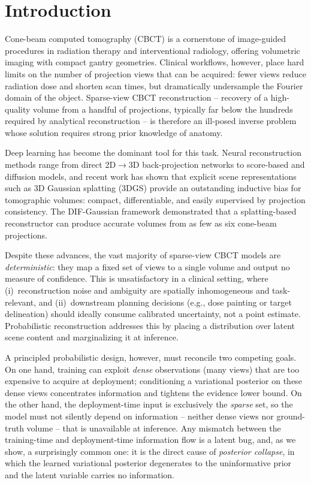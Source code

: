 
\section{Introduction}
\label{sec:intro}

Cone-beam computed tomography (CBCT) is a cornerstone of image-guided
procedures in radiation therapy and interventional radiology, offering
volumetric imaging with compact gantry geometries. Clinical workflows,
however, place hard limits on the number of projection views that can be
acquired: fewer views reduce radiation dose and shorten scan times, but
dramatically undersample the Fourier domain of the object. Sparse-view CBCT
reconstruction -- recovery of a high-quality volume from a handful of
projections, typically far below the hundreds required by analytical
reconstruction -- is therefore an ill-posed inverse problem whose solution
requires strong prior knowledge of anatomy.

Deep learning has become the dominant tool for this task. Neural
reconstruction methods range from direct 2D$\to$3D back-projection networks
to score-based and diffusion models, and recent work has shown that
explicit scene representations such as 3D Gaussian splatting (3DGS)
\cite{kerbl2023gaussiansplats} provide an outstanding inductive bias for
tomographic volumes: compact, differentiable, and easily supervised by
projection consistency. The DIF-Gaussian framework \cite{lin2024difgaussian}
demonstrated that a splatting-based reconstructor can produce accurate
volumes from as few as six cone-beam projections.

Despite these advances, the vast majority of sparse-view CBCT models are
\emph{deterministic}: they map a fixed set of views to a single volume and
output no measure of confidence. This is unsatisfactory in a clinical
setting, where (i)~reconstruction noise and ambiguity are spatially
inhomogeneous and task-relevant, and (ii)~downstream planning decisions
(e.g., dose painting or target delineation) should ideally consume
calibrated uncertainty, not a point estimate. Probabilistic reconstruction
addresses this by placing a distribution over latent scene content and
marginalizing it at inference.

A principled probabilistic design, however, must reconcile two competing
goals. On one hand, training can exploit \emph{dense} observations (many
views) that are too expensive to acquire at deployment; conditioning a
variational posterior on these dense views concentrates information and
tightens the evidence lower bound. On the other hand, the deployment-time
input is exclusively the \emph{sparse} set, so the model must not silently
depend on information -- neither dense views nor ground-truth volume -- that
is unavailable at inference. Any mismatch between the training-time and
deployment-time information flow is a latent bug, and, as we show, a
surprisingly common one: it is the direct cause of \emph{posterior
collapse}, in which the learned variational posterior degenerates to the
uninformative prior and the latent variable carries no information.

